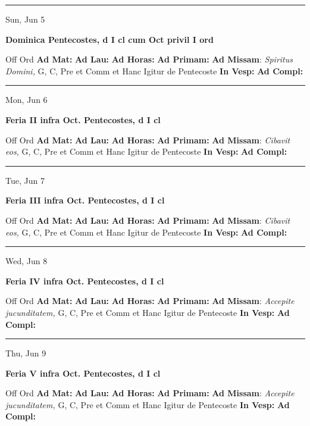 \documentclass[letterpaper, 10pt]{article}
\begin{document}
\hrule
\begin{center}
Sun, Jun 5
\end{center}\textbf{ \large Dominica Pentecostes, \textnormal{\normalsize d I cl cum Oct privil I ord}}
\begin{justify}
Off Ord
\textbf{Ad Mat: }
\textbf{Ad Lau: }
\textbf{Ad Horas: }
\textbf{Ad Primam: }
\textbf{Ad Missam}: \textit{Spiritus Domini,} G, C, Pre et Comm et Hanc Igitur de Pentecoste
\textbf{In Vesp: }
\textbf{Ad Compl: }\end{justify}



\hrule
\begin{center}
Mon, Jun 6
\end{center}\textbf{ \large Feria II infra Oct. Pentecostes, \textnormal{\normalsize d I cl}}
\begin{justify}
Off Ord
\textbf{Ad Mat: }
\textbf{Ad Lau: }
\textbf{Ad Horas: }
\textbf{Ad Primam: }
\textbf{Ad Missam}: \textit{Cibavit eos,} G, C, Pre et Comm et Hanc Igitur de Pentecoste
\textbf{In Vesp: }
\textbf{Ad Compl: }\end{justify}



\hrule
\begin{center}
Tue, Jun 7
\end{center}\textbf{ \large Feria III infra Oct. Pentecostes, \textnormal{\normalsize d I cl}}
\begin{justify}
Off Ord
\textbf{Ad Mat: }
\textbf{Ad Lau: }
\textbf{Ad Horas: }
\textbf{Ad Primam: }
\textbf{Ad Missam}: \textit{Cibavit eos,} G, C, Pre et Comm et Hanc Igitur de Pentecoste
\textbf{In Vesp: }
\textbf{Ad Compl: }\end{justify}



\hrule
\begin{center}
Wed, Jun 8
\end{center}\textbf{ \large Feria IV infra Oct. Pentecostes, \textnormal{\normalsize d I cl}}
\begin{justify}
Off Ord
\textbf{Ad Mat: }
\textbf{Ad Lau: }
\textbf{Ad Horas: }
\textbf{Ad Primam: }
\textbf{Ad Missam}: \textit{Accepite jucunditatem,} G, C, Pre et Comm et Hanc Igitur de Pentecoste
\textbf{In Vesp: }
\textbf{Ad Compl: }\end{justify}



\hrule
\begin{center}
Thu, Jun 9
\end{center}\textbf{ \large Feria V infra Oct. Pentecostes, \textnormal{\normalsize d I cl}}
\begin{justify}
Off Ord
\textbf{Ad Mat: }
\textbf{Ad Lau: }
\textbf{Ad Horas: }
\textbf{Ad Primam: }
\textbf{Ad Missam}: \textit{Accepite jucunditatem,} G, C, Pre et Comm et Hanc Igitur de Pentecoste
\textbf{In Vesp: }
\textbf{Ad Compl: }\end{justify}
\end{document}
